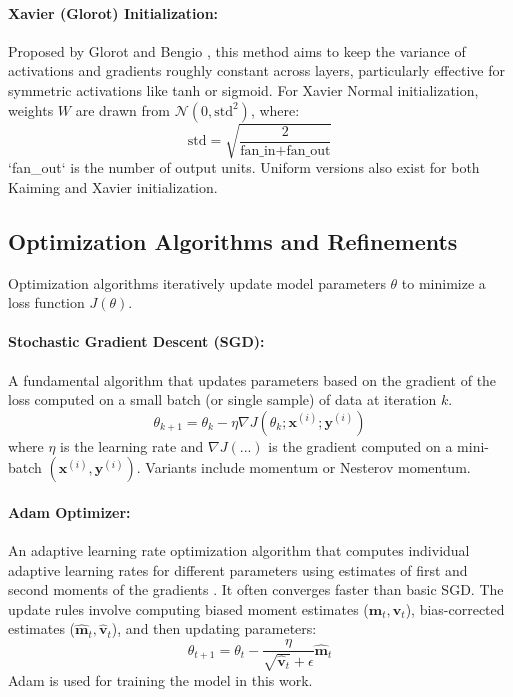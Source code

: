 \begin{appendices}
  \paragraph{Xavier (Glorot) Initialization:}
  Proposed by Glorot and Bengio \autocite{glorot2010understanding}, this method aims to keep the variance of activations and gradients roughly constant across layers, particularly effective for symmetric activations like tanh or sigmoid. For Xavier Normal initialization, weights \( W \) are drawn from \( \mathcal{N}(0, \text{std}^2) \), where:
  \begin{equation}
    \text{std} = \sqrt{\frac{2}{\text{fan\_in} + \text{fan\_out}}}
  \end{equation}
  `fan_out` is the number of output units. Uniform versions also exist for both Kaiming and Xavier initialization.

  \subsection{Optimization Algorithms and Refinements}
  Optimization algorithms iteratively update model parameters \( \theta \) to minimize a loss function \( J(\theta) \).

  \paragraph{Stochastic Gradient Descent (SGD):}
  A fundamental algorithm that updates parameters based on the gradient of the loss computed on a small batch (or single sample) of data at iteration \( k \).
  \begin{equation}
    \theta_{k+1} = \theta_k - \eta \nabla J(\theta_k; \bm{x}^{(i)}; \bm{y}^{(i)})
  \end{equation}
  where \( \eta \) is the learning rate and \( \nabla J(...) \) is the gradient computed on a mini-batch \( (\bm{x}^{(i)}, \bm{y}^{(i)}) \). Variants include momentum or Nesterov momentum.

  \paragraph{Adam Optimizer:}
  \label{eq:adam}
  An adaptive learning rate optimization algorithm that computes individual adaptive learning rates for different parameters using estimates of first and second moments of the gradients \autocite{kingma2014adam}. It often converges faster than basic SGD. The update rules involve computing biased moment estimates (\( \bm{m}_t, \bm{v}_t \)), bias-corrected estimates (\( \hat{\bm{m}}_t, \hat{\bm{v}}_t \)), and then updating parameters:
  \begin{equation}
    \theta_{t+1} = \theta_t - \frac{\eta}{\sqrt{\hat{\bm{v}}_t} + \epsilon} \hat{\bm{m}}_t
    \label{eq:adam-update} %
  \end{equation}
  Adam is used for training the model in this work.


\end{appendices}
